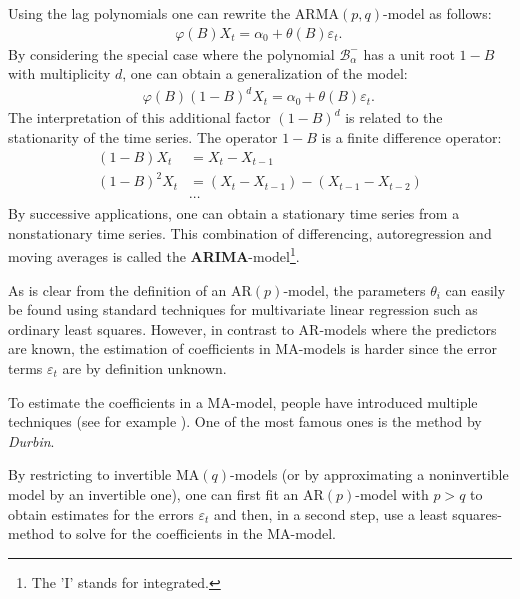     Using the lag polynomials one can rewrite the $\mathrm{ARMA}(p,q)$-model as follows:
    \begin{gather}
        \varphi(B)X_t = \alpha_0 + \theta(B)\varepsilon_t.\,
    \end{gather}
    By considering the special case where the polynomial $\mathcal{B}^-_\alpha$ has a unit root $1-B$ with multiplicity $d$, one can obtain a generalization of the model:
    \begin{gather}
        \varphi(B)(1-B)^dX_t = \alpha_0 + \theta(B)\varepsilon_t.\,
    \end{gather}
    The interpretation of this additional factor $(1-B)^d$ is related to the stationarity of the time series. The operator $1-B$ is a finite difference operator:
    \begin{align*}
        (1-B)X_t &= X_t - X_{t-1}\\
        (1-B)^2X_t &= (X_t-X_{t-1}) - (X_{t-1}-X_{t-2})\\
        &\cdots
    \end{align*}
    By successive applications, one can obtain a stationary time series from a nonstationary time series. This combination of differencing, autoregression and moving averages is called the \textbf{ARIMA}-model\footnote{The 'I' stands for integrated.}.


    \begin{remark}
        As is clear from the definition of an $\mathrm{AR}(p)$-model, the parameters $\theta_i$ can easily be found using standard techniques for multivariate linear regression such as ordinary least squares. However, in contrast to AR-models where the predictors are known, the estimation of coefficients in MA-models is harder since the error terms $\varepsilon_t$ are by definition unknown.
    \end{remark}
    To estimate the coefficients in a MA-model, people have introduced multiple techniques (see for example \cite{MA_fit}). One of the most famous ones is the method by \textit{Durbin}.
    \begin{method}[Durbin]
        By restricting to invertible $\mathrm{MA}(q)$-models (or by approximating a noninvertible model by an invertible one), one can first fit an $\mathrm{AR}(p)$-model with $p>q$ to obtain estimates for the errors $\varepsilon_t$ and then, in a second step, use a least squares-method to solve for the coefficients in the MA-model.
    \end{method}

